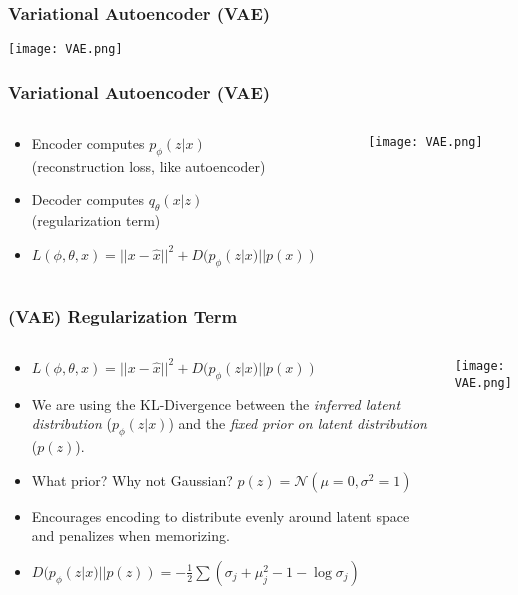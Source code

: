 \begin{frame}
    \frametitle{Variational Autoencoder (VAE)}
    \texttt{[image: VAE.png]}
\end{frame}

\begin{frame}
    \frametitle{Variational Autoencoder (VAE)}
    \begin{columns}
        \begin{column}{0.60\paperwidth}
            \begin{itemize}
                \item<1-> Encoder computes $p_\phi(z|x)$ \\(reconstruction loss, like
                    autoencoder)
                \item<2-> Decoder computes $q_\theta(x|z)$ \\(regularization term)
                \item<3-> $L(\phi,\theta,x) = ||x - \hat{x}||^2 + D(p_\phi(z|x)
                    || p(x))$
            \end{itemize}
        \end{column}
        \begin{column}{0.40\paperwidth}
            \texttt{[image: VAE.png]}
        \end{column}
    \end{columns}
\end{frame}

\begin{frame}
    \frametitle{(VAE) Regularization Term}
    \begin{columns}
        \begin{column}{0.60\paperwidth}
            \begin{itemize}
                \item<1-> $L(\phi,\theta,x) = ||x - \hat{x}||^2 + D(p_\phi(z|x)
                    || p(x))$
                \item<2-> We are using the KL-Divergence between the
                    \textit{inferred latent distribution} ($p_\phi(z|x)$) and
                    the \textit{fixed prior on latent distribution} ($p(z)$).
                \item<3-> What prior? Why not Gaussian? $p(z) =
                    \mathcal{N}(\mu=0, \sigma^2=1)$
                \item<4-> Encourages encoding to distribute evenly around latent
                    space and penalizes when memorizing.
                \item<4-> $D(p_\phi(z|x) || p(z)) = -\frac12\sum(\sigma_j +
                    \mu_j^2 - 1 -\log{\sigma_j})$
            \end{itemize}
        \end{column}
        \begin{column}{0.40\paperwidth}
            \texttt{[image: VAE.png]}
        \end{column}
    \end{columns}
\end{frame}

